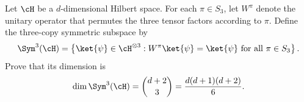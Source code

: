Let $\cH$ be a $d$-dimensional Hilbert space. For each $\pi\in S_3$, let $W^\pi$ denote the unitary operator that permutes the three tensor factors according to $\pi$. Define the three-copy symmetric subspace by
$$
\Sym^3(\cH)
=
\left\{
\ket{\psi}\in\cH^{\otimes3}:
W^\pi\ket{\psi}=\ket{\psi}\text{ for all }\pi\in S_3
\right\}.
$$
Prove that its dimension is
$$
\dim\Sym^3(\cH)
=
\binom{d+2}{3}
=
\frac{d(d+1)(d+2)}{6}.
$$
